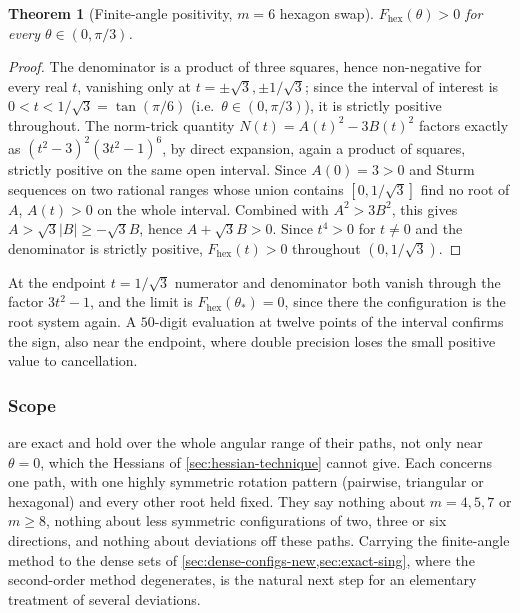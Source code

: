 \documentclass[11pt,reqno]{amsart}
\renewcommand{\_}{\origunderscore\allowbreak}
\numberwithin{equation}{section}
\theoremstyle{plain}
\newtheorem{thm}{Theorem}[section]
\theoremstyle{definition}
\theoremstyle{remark}
\begin{document}
\begin{thm}[Finite-angle positivity, $m=6$ hexagon swap]\label{thm:swap-m6-new}
$F_{\mathrm{hex}}(\theta)>0$ for every $\theta\in(0,\pi/3)$.
\end{thm}

\begin{proof}
The denominator is a product of three squares, hence non-negative for
every real $t$, vanishing only at $t=\pm\sqrt3,\pm1/\sqrt3$; since the
interval of interest is $0<t<1/\sqrt3=\tan(\pi/6)$ (i.e.\
$\theta\in(0,\pi/3)$), it is strictly positive throughout. The
norm-trick quantity $N(t)=A(t)^2-3B(t)^2$ factors exactly as
$(t^2-3)^2(3t^2-1)^6$, by direct expansion, again a product of squares,
strictly positive on the same open interval. Since $A(0)=3>0$ and Sturm
sequences on two rational ranges whose union contains $[0,1/\sqrt3]$
find no root of $A$, $A(t)>0$ on the whole interval. Combined with $A^2>3B^2$, this gives
$A>\sqrt3|B|\ge-\sqrt3B$, hence $A+\sqrt3B>0$. Since $t^4>0$ for $t\ne0$
and the denominator is strictly positive, $F_{\mathrm{hex}}(t)>0$
throughout $(0,1/\sqrt3)$.
\end{proof}

At the endpoint $t=1/\sqrt3$ numerator and denominator both vanish
through the factor $3t^2-1$, and the limit is $F_{\mathrm{hex}}(\theta_*)=0$,
since there the configuration is the root system again. A $50$-digit
evaluation at twelve points of the interval confirms the sign, also
near the endpoint, where double precision loses the small positive value
to cancellation.

\subsubsection{Scope}\label{sec:swap-scope}

 are exact and hold
over the whole angular range of their paths, not only near $\theta=0$,
which the Hessians of \cref{sec:hessian-technique} cannot give. Each
concerns one path, with one highly symmetric rotation pattern (pairwise,
triangular or hexagonal) and every other root held fixed. They say
nothing about $m=4,5,7$ or $m\ge8$, nothing about less symmetric
configurations of two, three or six directions, and nothing about
deviations off these paths. Carrying the finite-angle method to the
dense sets of \cref{sec:dense-configs-new,sec:exact-sing}, where the
second-order method degenerates, is the natural next step for an
elementary treatment of several deviations.
\end{document}
